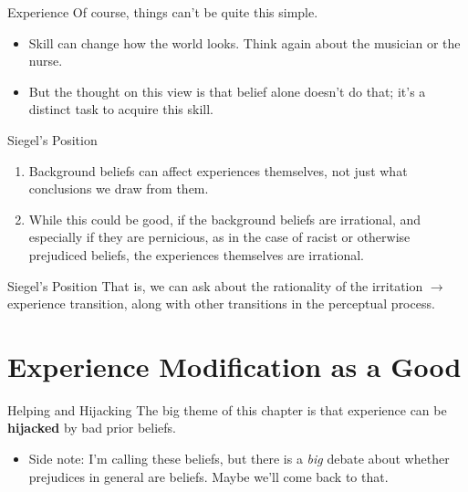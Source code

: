 \documentclass[
  17pt,
  letterpaper,
  ignorenonframetext,
  aspectratio=169,
  xcolor={dvipsnames}]{beamer}
\providecommand{\tightlist}{%
  \setlength{\itemsep}{0pt}\setlength{\parskip}{0pt}}\usepackage{longtable,booktabs,array}
\begin{document}
\begin{frame}{Experience}
\protect\hypertarget{experience-2}{}
Of course, things can't be quite this simple.

\begin{itemize}[<+->]
\tightlist
\item
  Skill can change how the world looks. Think again about the musician
  or the nurse.
\item
  But the thought on this view is that belief alone doesn't do that;
  it's a distinct task to acquire this skill.
\end{itemize}
\end{frame}

\begin{frame}{Siegel's Position}
\protect\hypertarget{siegels-position}{}
\begin{enumerate}[<+->]
\tightlist
\item
  Background beliefs can affect experiences themselves, not just what
  conclusions we draw from them.
\item
  While this could be good, if the background beliefs are irrational,
  and especially if they are pernicious, as in the case of racist or
  otherwise prejudiced beliefs, the experiences themselves are
  irrational.
\end{enumerate}
\end{frame}

\begin{frame}{Siegel's Position}
\protect\hypertarget{siegels-position-1}{}
That is, we can ask about the rationality of the irritation
\(\rightarrow\) experience transition, along with other transitions in
the perceptual process.
\end{frame}

\hypertarget{experience-modification-as-a-good}{%
\section{Experience Modification as a
Good}\label{experience-modification-as-a-good}}

\begin{frame}{Helping and Hijacking}
\protect\hypertarget{helping-and-hijacking}{}
The big theme of this chapter is that experience can be
\textbf{hijacked} by bad prior beliefs.

\begin{itemize}[<+->]
\tightlist
\item
  Side note: I'm calling these beliefs, but there is a \emph{big} debate
  about whether prejudices in general are beliefs. Maybe we'll come back
  to that.
\end{itemize}
\end{frame}
\end{document}
